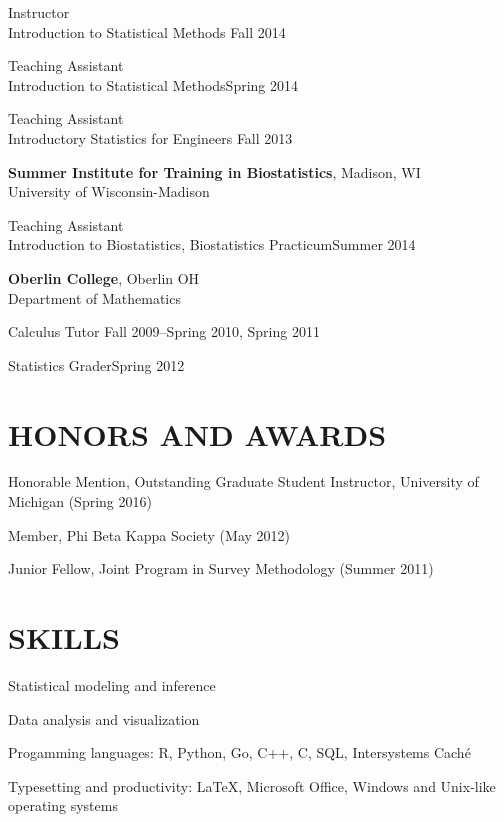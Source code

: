 \documentclass[letterpaper, 11pt]{article}
\begin{document}
\hspace{15pt}Instructor\\
\hspace{15pt}%
Introduction to Statistical Methods \hfill Fall 2014

\hspace{15pt}Teaching Assistant\\
\hspace{15pt}%
Introduction to Statistical Methods\hfill Spring 2014

\hspace{15pt}Teaching Assistant\\
\hspace{15pt}%
Introductory Statistics for Engineers \hfill Fall 2013

\vspace{6pt}
{\bf Summer Institute for Training in Biostatistics}, Madison, WI\\
University of Wisconsin-Madison

\hspace{15pt}Teaching Assistant\\
\hspace{15pt}Introduction to Biostatistics, Biostatistics Practicum\hfill Summer 2014

\vspace{6pt}
{\bf Oberlin College}, Oberlin OH\\
Department of Mathematics

\hspace{15pt}Calculus Tutor \hfill Fall 2009--Spring 2010, Spring 2011

\hspace{15pt}Statistics Grader\hfill Spring 2012

\vspace{18pt}
\section{HONORS AND AWARDS}          
Honorable Mention, Outstanding Graduate Student Instructor, University of Michigan (Spring 2016)

Member, Phi Beta Kappa Society (May 2012)

Junior Fellow, Joint Program in Survey Methodology (Summer 2011)
   
\section{SKILLS}
Statistical modeling and inference

Data analysis and visualization

Progamming languages:  R, Python, Go, C++, C, SQL, Intersystems Cach\'{e}

Typesetting and productivity:  \LaTeX, Microsoft Office, Windows and Unix-like operating systems

\label{sec:lastpage}
\end{document}
